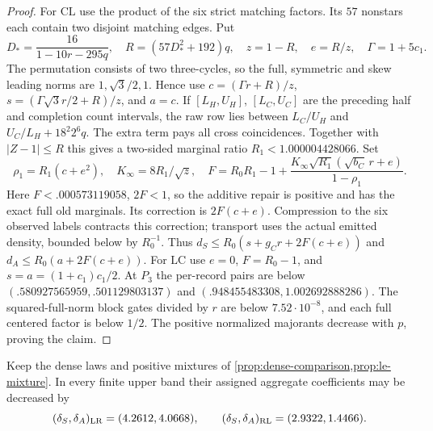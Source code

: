 \begin{proof}
For $\mathrm{CL}$ use the product of the six strict matching factors.
Its $57$ nonstars each contain two disjoint matching edges. Put
\[
 D_*=\frac{16}{1-10r-295q},\quad R=(57D_*^2+192)q,\quad
 z=1-R,\quad e=R/z,\quad\Gamma=1+5c_1.
\]
The permutation consists of two three-cycles, so the full, symmetric
and skew leading norms are $1,\sqrt3/2,1$. Hence use
$c=(\Gamma r+R)/z$, $s=(\Gamma\sqrt3 r/2+R)/z$, and $a=c$.
If $[L_H,U_H]$, $[L_C,U_C]$ are the preceding half and completion
count intervals, the raw row lies between $L_C/U_H$ and
$U_C/L_H+18^2 2^6q$. The extra term pays all cross coincidences.
Together with $|Z-1|\le R$ this gives a two-sided marginal ratio
$R_1<1.000004428066$. Set
\[
 \rho_1=R_1(c+e^2),\quad K_\infty=8R_1/\sqrt z,\quad
 F=R_0R_1-1+
       \frac{K_\infty\sqrt{R_1}(\sqrt{b_C}\,r+e)}{1-\rho_1}.
\]
Here $F<.000573119058$, $2F<1$, so the additive repair is positive
and has the exact full old marginals. Its correction is $2F(c+e)$.
Compression to the six observed labels contracts this correction;
transport uses the actual emitted density, bounded below by $R_0^{-1}$.
Thus $d_S\le R_0(s+g_Cr+2F(c+e))$ and
$d_A\le R_0(a+2F(c+e))$. For $\mathrm{LC}$ use $e=0$,
$F=R_0-1$, and $s=a=(1+c_1)c_1/2$.
At $P_3$ the per-record pairs are below
$(.580927565959,.501129803137)$ and
$(.948455483308,1.002692888286)$.
The squared-full-norm block gates divided by $r$ are below
$7.52\cdot10^{-8}$, and each full centered factor is below $1/2$.
The positive normalized majorants decrease with $p$, proving the claim.
\end{proof}

\begin{proposition}\label{prop:upper-observed-dense}
Keep the dense laws and positive mixtures of
\cref{prop:dense-comparison,prop:le-mixture}. In every finite upper band
their assigned aggregate coefficients may be decreased by
\[
 (\delta_S,\delta_A)_{\rm LR}=(4.2612,4.0668),\qquad
 (\delta_S,\delta_A)_{\rm RL}=(2.9322,1.4466).
\]
\end{proposition}

